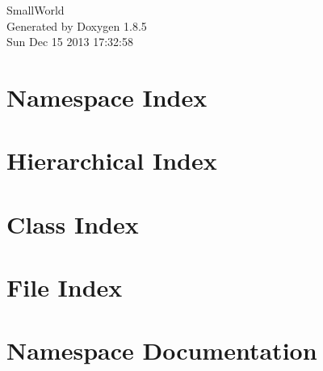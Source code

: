 \documentclass[twoside]{book}
\newcommand{\clearemptydoublepage}{%
  \newpage{\pagestyle{empty}\cleardoublepage}%
}
\begin{document}
\hypersetup{pageanchor=false}
\begin{titlepage}
\vspace*{7cm}
\begin{center}%
{\Large Small\-World }\\
\vspace*{1cm}
{\large Generated by Doxygen 1.8.5}\\
\vspace*{0.5cm}
{\small Sun Dec 15 2013 17:32:58}\\
\end{center}
\end{titlepage}
\clearemptydoublepage
\tableofcontents
\clearemptydoublepage
{}
\hypersetup{pageanchor=true}

\chapter{Namespace Index}

\chapter{Hierarchical Index}

\chapter{Class Index}

\chapter{File Index}

\chapter{Namespace Documentation}


\end{document}
